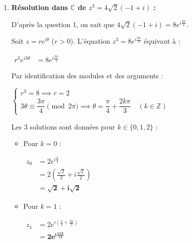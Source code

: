 \documentclass[12pt,a4paper]{article}
\begin{document}
\begin{enumerate}
\begin{enumerate}
        $
        \begin{aligned}
            Z_2 &= (1 + i)\left(-\frac{1}{2} - i\frac{\sqrt{3}}{2}\right)\\
            &= -\frac{1}{2} - i\frac{\sqrt{3}}{2} - \frac{1}{2}i - i^2\frac{\sqrt{3}}{2}\\
            &= \mathbf{\frac{\sqrt{3} - 1}{2} - i\frac{\sqrt{3} + 1}{2}}
        \end{aligned}
        $
    \end{enumerate}

    \item \textbf{Résolution dans $\mathbb{C}$ de $z^3 = 4\sqrt{2}(-1 + i)$ :}
    
    D'après la question 1, on sait que $4\sqrt{2}(-1 + i) = 8e^{i\frac{3\pi}{4}}$.
    
    Soit $z = r e^{i\theta}$ ($r > 0$). L'équation $z^3 = 8e^{i\frac{3\pi}{4}}$ équivaut à :
    
    $
    \begin{aligned}
        r^3 e^{i3\theta} &= 8e^{i\frac{3\pi}{4}}
    \end{aligned}
    $
    
    Par identification des modules et des arguments :
    
    $
    \begin{cases}
        r^3 = 8 \implies r = 2 \\
        3\theta \equiv \dfrac{3\pi}{4} \pmod{2\pi} \implies \theta = \dfrac{\pi}{4} + \dfrac{2k\pi}{3} \quad (k \in \mathbb{Z})
    \end{cases}
    $
    
    Les $3$ solutions sont données pour $k \in \{0, 1, 2\}$ :
    \begin{itemize}
        \item Pour $k = 0$ :
        
        $
        \begin{aligned}
            z_0 &= 2e^{i\frac{\pi}{4}}\\
            &= 2\left(\frac{\sqrt{2}}{2} + i\frac{\sqrt{2}}{2}\right)\\
            &= \mathbf{\sqrt{2} + i\sqrt{2}}
        \end{aligned}
        $
        
        \item Pour $k = 1$ :
        
        $
        \begin{aligned}
            z_1 &= 2e^{i\left(\frac{\pi}{4} + \frac{2\pi}{3}\right)}\\
            &= \mathbf{2e^{i\frac{11\pi}{12}}}
        \end{aligned}
        $
        

\end{itemize}
\end{enumerate}
\end{document}
